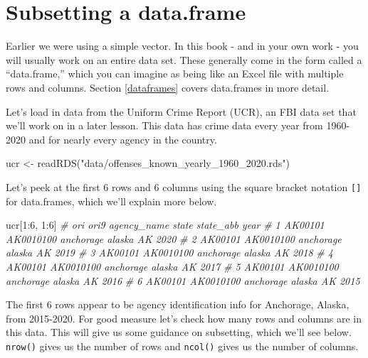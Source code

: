 \documentclass[
  a4paper,
]{krantz}
\makeatletter
\newenvironment{Shaded}{\begin{snugshade}}{\end{snugshade}}
\newcommand{\CommentTok}[1]{\textcolor[rgb]{0.37,0.37,0.37}{\textit{#1}}}
\newcommand{\DecValTok}[1]{\textcolor[rgb]{0.06,0.06,0.06}{#1}}
\newcommand{\FunctionTok}[1]{\textcolor[rgb]{0,0,0}{#1}}
\newcommand{\NormalTok}[1]{#1}
\newcommand{\OtherTok}[1]{\textcolor[rgb]{0.37,0.37,0.37}{#1}}
\newcommand{\SpecialCharTok}[1]{\textcolor[rgb]{0,0,0}{#1}}
\newcommand{\StringTok}[1]{\textcolor[rgb]{0.5,0.5,0.5}{#1}}
\newenvironment{kframe}{%
\medskip{}
\setlength{\fboxsep}{.8em}
 \def\at@end@of@kframe{}%
 \ifinner\ifhmode%
  \def\at@end@of@kframe{\end{minipage}}%
  \begin{minipage}{\columnwidth}%
 \fi\fi%
 \def\FrameCommand##1{\hskip\@totalleftmargin \hskip-\fboxsep
 \colorbox{shadecolor}{##1}\hskip-\fboxsep
     \hskip-\linewidth \hskip-\@totalleftmargin \hskip\columnwidth}%
 \MakeFramed {\advance\hsize-\width
   \@totalleftmargin\z@ \linewidth\hsize
   \@setminipage}}%
 {\par\unskip\endMakeFramed%
 \at@end@of@kframe}
\renewenvironment{Shaded}{\begin{kframe}}{\end{kframe}}
\makeatother
\begin{document}
\hypertarget{subsetting-a-data.frame}{%
\section{Subsetting a
data.frame}\label{subsetting-a-data.frame}}

Earlier we were using a simple vector. In this book - and in
your own work - you will usually work on an entire data set.
These generally come in the form called a ``data.frame,''
which you can imagine as being like an Excel file with
multiple rows and columns. Section \ref{dataframes} covers
data.frames in more detail.

Let's load in data from the Uniform Crime Report (UCR), an
FBI data set that we'll work on in a later lesson. This data
has crime data every year from 1960-2020 and for nearly
every agency in the country.

\begin{Shaded}
\begin{Highlighting}[]
\NormalTok{ucr }\OtherTok{\textless{}{-}} \FunctionTok{readRDS}\NormalTok{(}\StringTok{"data/offenses\_known\_yearly\_1960\_2020.rds"}\NormalTok{)}
\end{Highlighting}
\end{Shaded}

Let's peek at the first 6 rows and 6 columns using the
square bracket notation \texttt{{[}{]}} for data.frames,
which we'll explain more below.

\begin{Shaded}
\begin{Highlighting}[]
\NormalTok{ucr[}\DecValTok{1}\SpecialCharTok{:}\DecValTok{6}\NormalTok{, }\DecValTok{1}\SpecialCharTok{:}\DecValTok{6}\NormalTok{]}
\CommentTok{\#       ori      ori9 agency\_name  state state\_abb year}
\CommentTok{\# 1 AK00101 AK0010100   anchorage alaska        AK 2020}
\CommentTok{\# 2 AK00101 AK0010100   anchorage alaska        AK 2019}
\CommentTok{\# 3 AK00101 AK0010100   anchorage alaska        AK 2018}
\CommentTok{\# 4 AK00101 AK0010100   anchorage alaska        AK 2017}
\CommentTok{\# 5 AK00101 AK0010100   anchorage alaska        AK 2016}
\CommentTok{\# 6 AK00101 AK0010100   anchorage alaska        AK 2015}
\end{Highlighting}
\end{Shaded}

The first 6 rows appear to be agency identification info for
Anchorage, Alaska, from 2015-2020. For good measure let's
check how many rows and columns are in this data. This will
give us some guidance on subsetting, which we'll see below.
\texttt{nrow()} gives us the number of rows and
\texttt{ncol()} gives us the number of columns.
\end{document}

